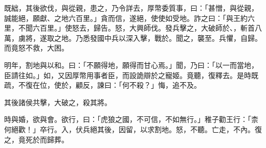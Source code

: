 既絀，其後欲伐，與從親，患之，乃令詳去，厚幣委質事，曰：「甚憎，與從親，誠能絕，願獻、之地六百里。」貪而信，遂絕，使使如受地。詐之曰：「與王約六里，不聞六百里。」使怒去，歸告。怒，大興師伐。發兵擊之，大破師於、，斬首八萬，虜將，遂取之地。乃悉發國中兵以深入擊，戰於。聞之，襲至。兵懼，自歸。而竟怒不救，大困。

明年，割地與以和。曰：「不願得地，願得而甘心焉。」聞，乃曰：「以一而當地，臣請往如。」如，又因厚幣用事者臣，而設詭辯於之寵姬。竟聽，復釋去。是時既疏，不復在位，使於，顧反，諫曰：「何不殺？」悔，追不及。

其後諸侯共擊，大破之，殺其將。

時與婚，欲與會。欲行，曰：「虎狼之國，不可信，不如無行。」稚子勸王行：「柰何絕歡！」卒行。入，伏兵絕其後，因留，以求割地。怒，不聽。亡走，不內。復之，竟死於而歸葬。

